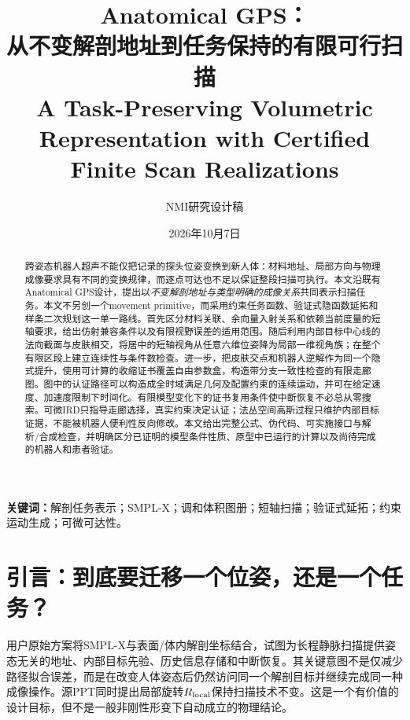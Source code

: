 \documentclass[UTF8,11pt,a4paper,fontset=fandol]{ctexart}
\numberwithin{equation}{section}
\theoremstyle{definition}
\begin{document}
\title{Anatomical GPS：\\从不变解剖地址到任务保持的有限可行扫描\\[3mm]
\large A Task-Preserving Volumetric Representation with Certified Finite Scan Realizations}
\author{NMI研究设计稿}
\date{2026年10月7日}
\maketitle
\begin{abstract}
跨姿态机器人超声不能仅把记录的探头位姿变换到新人体：材料地址、局部方向与物理成像要求具有不同的变换规律，而逐点可达也不足以保证整段扫描可执行。本文沿既有Anatomical GPS设计，提出以\emph{不变解剖地址与类型明确的成像关系}共同表示扫描任务。本文不另创一个movement primitive，而采用约束任务函数、验证式隐函数延拓和样条二次规划这一单一路线。首先区分材料关联、余向量入射关系和依赖当前度量的短轴要求，给出仿射兼容条件以及有限视野误差的适用范围。随后利用内部目标中心线的法向截面与皮肤相交，将居中的短轴视角从任意六维位姿降为局部一维视角族；在整个有限区段上建立连续性与条件数检查。进一步，把皮肤交点和机器人逆解作为同一个隐式提升，使用可计算的收缩证书覆盖自由参数盒，构造带分支一致性检查的有限走廊图。图中的认证路径可以构造成全时域满足几何及配置约束的连续运动，并可在给定速度、加速度限制下时间化。有限模型变化下的证书复用条件使中断恢复不必总从零搜索。可微IRD只指导走廊选择，真实约束决定认证；法丛空间高斯过程只维护内部目标证据，不能被机器人便利性反向修改。本文给出完整公式、伪代码、可实施接口与解析/合成检查，并明确区分已证明的模型条件性质、原型中已运行的计算以及尚待完成的机器人和患者验证。
\end{abstract}
\noindent\textbf{关键词：}解剖任务表示；SMPL-X；调和体积图册；短轴扫描；验证式延拓；约束运动生成；可微可达性。

\begin{center}\end{center}
\clearpage
\setcounter{tocdepth}{1}
\tableofcontents
\clearpage

\section{引言：到底要迁移一个位姿，还是一个任务？}
用户原始方案将SMPL-X与表面/体内解剖坐标结合，试图为长程静脉扫描提供姿态无关的地址、内部目标先验、历史信息存储和中断恢复。其关键意图不是仅减少路径拟合误差，而是在改变人体姿态后仍然访问同一个解剖目标并继续完成同一种成像操作。源PPT同时提出局部旋转$R_{\rm local}$保持扫描技术不变。这是一个有价值的设计目标，但不是一般非刚性形变下自动成立的物理结论。
\end{document}
